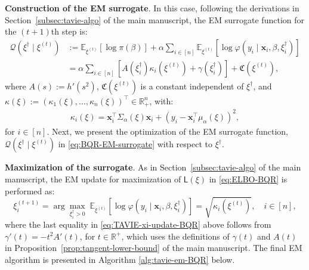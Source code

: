 \documentclass[12pt]{article}
\numberwithin{equation}{section}
\begin{document}
\textbf{Construction of the EM surrogate}. In this case, following the derivations in Section~\ref{subsec:tavie-algo} of the main manuscript, the EM surrogate function for the $(t+1)$th step is:
%
\begin{equation}
\label{eq:BQR-EM-surrogate}
\begin{split}
\mathcal{Q}(\xi^{\dagger} \mid \xi^{(t)}) &:= \mathbb{E}_{\xi^{(t)}}[\log \pi(\beta)] + \alpha\sum_{i \in [n]} \mathbb{E}_{\xi^{(t)}}\left[\log \varphi(y_i \mid \mathbf{x}_i, \beta, \xi_i^{\dagger})\right]
\\ &= \alpha \sum_{i \in [n]} \left[A(\xi_i^{\dagger})\kappa_i(\xi^{(t)}) + \gamma(\xi_{i}^{\dagger})\right] + \mathfrak{C}(\xi^{(t)}),
\end{split}
\end{equation}
%
where $A(s) := h'(s^2)$, $\mathfrak{C}(\xi^{(t)})$ is a constant independent of $\xi^{\dagger}$, and $\kappa(\xi) := (\kappa_1(\xi),\ldots, \kappa_n(\xi))^{\top} \in \mathbb{R}^{n}_{+}$, with:
%
\begin{align}\label{eq:kappa-BQR}
    \kappa_i(\xi) = 
        \mathbf{x}_i^{\top}\Sigma_{\alpha}(\xi) \mathbf{x}_i + \left(y_i - \mathbf{x}_{i}^{\top}\mu_{\alpha}(\xi)\right)^2,
\end{align}
for $i\in [n]$. Next, we present the optimization of the EM surrogate function, $\mathcal{Q}(\xi^{\dagger}\mid \xi^{(t)})$ in \eqref{eq:BQR-EM-surrogate} with respect to $\xi^{\dagger}$.

\textbf{Maximization of the surrogate}. As in Section~\ref{subsec:tavie-algo} of the main manuscript, the  EM update for maximization of $\mathsf{L}(\xi)$ in \eqref{eq:ELBO-BQR} is performed as:
\begin{equation}
\label{eq:TAVIE-xi-update-BQR}
{\xi}_i^{(t+1)}
= \arg\max_{{\xi}_i^{\dagger} > 0}\;\mathbb{E}_{\xi^{(t)}} \left[\log \varphi(y_i \mid \mathbf{x}_i, \beta, {\xi}_i^{\dagger}) \right] = \sqrt{\kappa_i(\xi^{(t)})},\quad i\in [n],
\end{equation}
where the last equality in \eqref{eq:TAVIE-xi-update-BQR} above follows from $\gamma'(t) = -t^2 A'(t)$, for $t\in \mathbb{R}^{+}$, which uses the definitions of $\gamma(t)$ and $A(t)$ in Proposition~\ref{prop:tangent-lower-bound} of the main manuscript. The final EM algorithm is presented in Algorithm \ref{alg:tavie-em-BQR} below.
\end{document}
